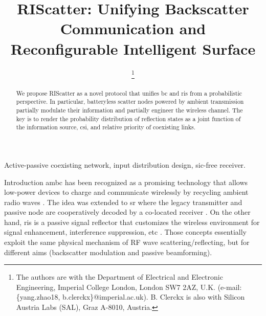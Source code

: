 \documentclass[journal]{IEEEtran}
\begin{document}
\title{RIScatter: Unifying Backscatter Communication and Reconfigurable Intelligent Surface}
\author{
	\thanks{
		The authors are with the Department of Electrical and Electronic Engineering, Imperial College London, London SW7 2AZ, U.K. (e-mail: \{yang.zhao18, b.clerckx\}@imperial.ac.uk).
		B. Clerckx is also with Silicon Austria Labs (SAL), Graz A-8010, Austria.
	}
}
\maketitle

\begin{abstract}
	We propose RIScatter as a novel protocol that unifies \gls{bc} and \gls{ris} from a probabilistic perspective.
	In particular, batteryless scatter nodes powered by ambient transmission partially modulate their information and partially engineer the wireless channel.
	The key is to render the probability distribution of reflection states as a joint function of the information source, \gls{csi}, and relative priority of coexisting links.
\end{abstract}

\begin{IEEEkeywords}
	Active-passive coexisting network, input distribution design, \gls{sic}-free receiver.
\end{IEEEkeywords}

\glsresetall

\begin{section}{Introduction}
	\label{sc:introduction}
	\gls{ambc} has been recognized as a promising technology that allows low-power devices to charge and communicate wirelessly by recycling ambient radio waves \cite{Liu2013b}.
	The idea was extended to \gls{sr} where the legacy transmitter and passive node are cooperatively decoded by a co-located receiver \cite{Liang2020}.
	On the other hand, \gls{ris} is a passive signal reflector that customizes the wireless environment for signal enhancement, interference suppression, etc \cite{Wu2021b}.
	Those concepts essentially exploit the same physical mechanism of RF wave scattering/reflecting, but for different aims (backscatter modulation and passive beamforming).
\end{section}
\end{document}
